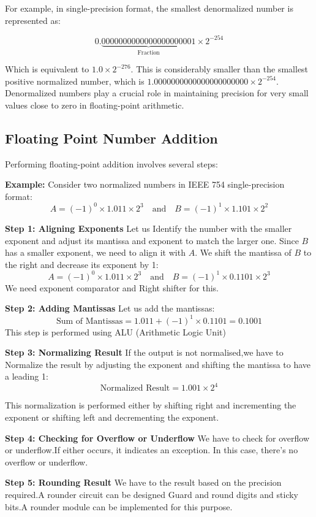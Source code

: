 \documentclass[a4paper,12pt]{article}
\begin{document}
For example, in single-precision format, the smallest denormalized number is
represented as:

\[ 0.\underbrace{0000 0000 0000 0000 0000 01}_{\text{Fraction}} \times 2^{-254} \]

Which is equivalent to \(1.0 \times 2^{-276}\). This is considerably smaller
than the smallest positive normalized number, which is \(1.0000 0000 0000 0000
0000 00 \times 2^{-254}\). Denormalized numbers play a crucial role in
maintaining precision for very small values close to zero in floating-point
arithmetic.

\subsection{Floating Point Number Addition}

Performing floating-point addition involves several steps:

\textbf{Example:}
Consider two normalized numbers in IEEE 754 single-precision format:
\[
    A = (-1)^0 \times 1.011 \times 2^3 \quad \text{and} \quad B = (-1)^1 \times 1.101 \times 2^2
\]

\textbf{Step 1: Aligning Exponents}
Let us Identify the number with the smaller exponent and adjust its mantissa and exponent to match the larger one. Since \( B \) has a smaller exponent, we need to align it with \( A \). We shift the mantissa of \( B \) to the right and decrease its exponent by 1:
\[
    A = (-1)^0 \times 1.011 \times 2^3 \quad \text{and} \quad B = (-1)^1 \times 0.1101 \times 2^3
\]
We need exponent comparator and Right shifter for this.

\textbf{Step 2: Adding  Mantissas}
Let us add the mantissas:
\[
    \text{Sum of Mantissas} = 1.011 + (-1)^1 \times 0.1101 = 0.1001
\]
This step is performed using ALU (Arithmetic Logic Unit)

\textbf{Step 3: Normalizing Result}
If the output is not normalised,we have to  Normalize the result by adjusting the exponent and shifting the mantissa to have a leading 1:
\[
    \text{Normalized Result} = 1.001 \times 2^4
\]

This normalization is performed either by shifting right and incrementing the
exponent or shifting left and decrementing the exponent.

\textbf{Step 4: Checking for Overflow or Underflow}
We have to check for overflow or underflow.If either occurs, it indicates an exception.
In this case, there's no overflow or underflow.

\textbf{Step 5: Rounding Result}
We have to the result based on the precision required.A rounder circuit can be designed Guard and round digits and sticky bits.A rounder module can be implemented for this purpose.
\end{document}
